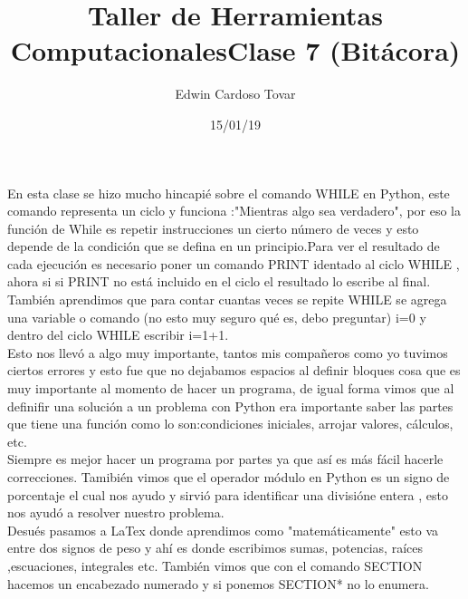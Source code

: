 \documentclass[letterpaper, 12pt, oneside]{article}%
\title{\Huge Taller de Herramientas Computacionales}
\author{Edwin Cardoso Tovar}%
\date{15/01/19}%
\begin{document}
	\maketitle
	\begin{center}%
	\end{center}%
	\newpage%
	
	\title{\Huge Clase 7 (Bitácora)  \\}%
	
En esta clase se hizo mucho hincapié sobre el comando WHILE en Python, este comando representa un ciclo y funciona :"Mientras algo sea verdadero", por eso la función de While es repetir instrucciones un cierto número de veces y esto depende de la condición que se defina en un principio.Para ver el resultado de cada ejecución es necesario poner un comando PRINT identado al ciclo WHILE , ahora si si PRINT no está incluido en el ciclo el resultado lo escribe al final. También aprendimos que para contar cuantas veces se repite WHILE se agrega una variable o comando (no esto muy seguro qué es, debo preguntar) i=0 y dentro del ciclo WHILE escribir i=1+1.\\

Esto nos llevó a algo muy importante, tantos mis compañeros como yo tuvimos ciertos errores y esto fue que no dejabamos espacios al definir bloques cosa que es muy importante al momento de hacer un programa, de igual forma vimos que al definifir una solución a un problema con Python era importante saber las partes que tiene una función como lo son:condiciones iniciales, arrojar valores, cálculos, etc.\\
Siempre es mejor hacer un programa por partes ya que así es más fácil hacerle correcciones.
Tamibién vimos que el operador módulo en Python es un signo de porcentaje el cual nos ayudo y sirvió para identificar una divisióne entera , esto nos ayudó a resolver nuestro problema.\\

Desués pasamos a LaTex donde aprendimos como "matemáticamente" esto va entre dos signos de peso y ahí es donde escribimos sumas, potencias, raíces ,escuaciones, integrales etc. También vimos que con el comando SECTION hacemos un encabezado numerado y si ponemos SECTION* no lo enumera.

	
	
	
	
	
	
	
	
	
	
	
	
	
	
	
	
\end{document}
